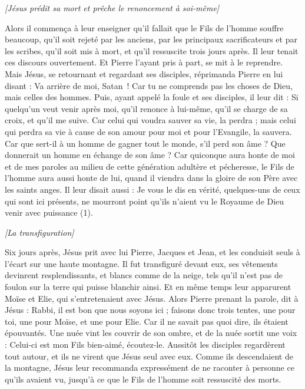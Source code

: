\begin{multicols}{2}
\begin{center}
\textit{[Jésus prédit sa mort et prêche le renoncement à soi-même]}
\end{center}
\PPE{}
Alors il commença à leur enseigner qu'il fallait que le Fils de l'homme souffre beaucoup, qu'il soit rejeté par les anciens, par les principaux sacrificateurs et par les scribes, qu'il soit mis à mort, et qu'il ressuscite trois jours après.
Il leur tenait ces discours ouvertement. Et Pierre l’ayant pris à part, se mit à le reprendre.
Mais Jésus, se retournant et regardant ses disciples, réprimanda Pierre en lui disant : Va arrière de moi, Satan ! Car tu ne comprends pas les choses de Dieu, mais celles des hommes.
Puis, ayant appelé la foule et ses disciples, il leur dit : Si quelqu’un veut venir après moi, qu'il renonce à lui-même, qu'il se charge de sa croix, et qu’il me suive.
Car celui qui voudra sauver sa vie, la perdra ; mais celui qui perdra sa vie à cause de son amour pour moi et pour l'Evangile, la sauvera.
Car que sert-il à un homme de gagner tout le monde, s'il perd son âme ?
Que donnerait un homme en échange de son âme ?
Car quiconque aura honte de moi et de mes paroles au milieu de cette génération adultère et pécheresse, le Fils de l'homme aura aussi honte de lui, quand il viendra dans la gloire de son Père avec les saints anges.
\VerseOne{}Il leur disait aussi : Je vous le dis en vérité, quelques-uns de ceux qui sont ici présents, ne mourront point qu’ils n’aient vu le Royaume de Dieu venir avec puissance (1).
\begin{center}
\textit{[La transfiguration]}
\end{center}
\PPE{}
Six jours après, Jésus prit avec lui Pierre, Jacques et Jean, et les conduisit seuls à l'écart sur une haute montagne. Il fut transfiguré devant eux,
ses vêtements devinrent resplendissants, et blancs comme de la neige, tels qu'il n’est pas de foulon sur la terre qui puisse blanchir ainsi.
Et en même temps leur apparurent Moïse et Elie, qui s’entretenaient avec Jésus.
Alors Pierre prenant la parole, dit à Jésus : Rabbi, il est bon que nous soyons ici ; faisons donc trois tentes, une pour toi, une pour Moïse, et une pour Elie.
Car il ne savait pas quoi dire, ils étaient épouvantés.
Une nuée vint les couvrir de son ombre, et de la nuée sortit une voix : Celui-ci est mon Fils bien-aimé, écoutez-le.
Aussitôt les disciples regardèrent tout autour, et ils ne virent que Jésus seul avec eux.
Comme ils descendaient de la montagne, Jésus leur recommanda expressément de ne raconter à personne ce qu'ils avaient vu, jusqu’à ce que le Fils de l'homme soit ressuscité des morts.

\end{multicols}
